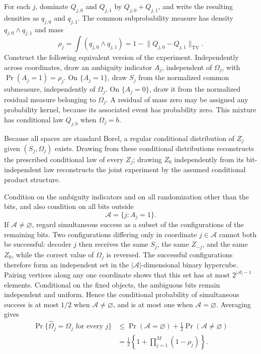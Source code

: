 For each \(j\), dominate \(Q_{j,0}\) and \(Q_{j,1}\) by \(Q_{j,0}+Q_{j,1}\), and write the resulting densities as \(q_{j,0}\) and \(q_{j,1}\).  The common subprobability measure has density \(q_{j,0}\wedge q_{j,1}\) and mass
\[
 \rho_j=\int(q_{j,0}\wedge q_{j,1})
 =1-\lVert Q_{j,0}-Q_{j,1}\rVert_{\mathrm{TV}}.
\]
Construct the following equivalent version of the experiment.  Independently across coordinates, draw an ambiguity indicator \(A_j\), independent of \(\Omega_j\), with \(\Pr(A_j=1)=\rho_j\).  On \(\{A_j=1\}\), draw \(S_j\) from the normalized common submeasure, independently of \(\Omega_j\).  On \(\{A_j=0\}\), draw it from the normalized residual measure belonging to \(\Omega_j\).  A residual of mass zero may be assigned any probability kernel, because its associated event has probability zero.  This mixture has conditional law \(Q_{j,b}\) when \(\Omega_j=b\).

Because all spaces are standard Borel, a regular conditional distribution of \(Z_j\) given \((S_j,\Omega_j)\) exists.  Drawing from these conditional distributions reconstructs the prescribed conditional law of every \(Z_j\); drawing \(Z_0\) independently from its bit-independent law reconstructs the joint experiment by the assumed conditional product structure.

Condition on the ambiguity indicators and on all randomization other than the bits, and also condition on all bits outside
\[
 \mathcal A=\{j:A_j=1\}.
\]
If \(\mathcal A\neq\varnothing\), regard simultaneous success as a subset of the configurations of the remaining bits.  Two configurations differing only in coordinate \(j\in\mathcal A\) cannot both be successful: decoder \(j\) then receives the same \(S_j\), the same \(Z_{-j}\), and the same \(Z_0\), while the correct value of \(\Omega_j\) is reversed.  The successful configurations therefore form an independent set in the \(|\mathcal A|\)-dimensional binary hypercube.  Pairing vertices along any one coordinate shows that this set has at most \(2^{|\mathcal A|-1}\) elements.  Conditional on the fixed objects, the ambiguous bits remain independent and uniform.  Hence the conditional probability of simultaneous success is at most \(1/2\) when \(\mathcal A\neq\varnothing\), and is at most one when \(\mathcal A=\varnothing\).  Averaging gives
\[
\begin{aligned}
 \Pr\{\widehat\Omega_j=\Omega_j\text{ for every }j\}
 &\leq \Pr(\mathcal A=\varnothing)+\frac12\Pr(\mathcal A\neq\varnothing)\\
 &=\frac12\left\{1+\prod_{j=1}^M(1-\rho_j)\right\}.
\end{aligned}
\]

